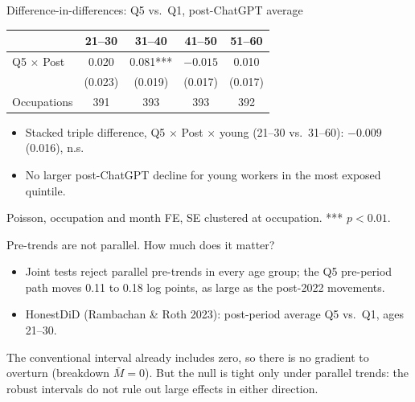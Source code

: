 \begin{frame}{Difference-in-differences: Q5 vs.\ Q1, post-ChatGPT average}
\centering
\setlength{\tabcolsep}{8pt}
\begin{tabular}{lcccc}
\toprule
 & 21--30 & 31--40 & 41--50 & 51--60 \\
\midrule
Q5 $\times$ Post & 0.020 & 0.081*** & $-0.015$ & 0.010 \\
                 & (0.023) & (0.019) & (0.017) & (0.017) \\
\midrule
Occupations & 391 & 393 & 393 & 392 \\
\bottomrule
\end{tabular}

\vspace{0.8em}
\begin{itemize}\setlength{\itemsep}{4pt}
  \item Stacked triple difference, Q5 $\times$ Post $\times$ young (21--30 vs.\ 31--60): $-0.009$ (0.016), n.s.
  \item No larger post-ChatGPT decline for young workers in the most exposed quintile.
\end{itemize}

\vspace{0.2em}
\footnotesize
Poisson, occupation and month FE, SE clustered at occupation. *** $p<0.01$.
\end{frame}

\begin{frame}{Pre-trends are not parallel. How much does it matter?}
\small
\begin{itemize}\setlength{\itemsep}{2pt}
  \item Joint tests reject parallel pre-trends in every age group; the Q5 pre-period path moves 0.11 to 0.18 log points, as large as the post-2022 movements.
  \item HonestDiD (Rambachan \& Roth 2023): post-period average Q5 vs.\ Q1, ages 21--30.
\end{itemize}

\vspace{0.2em}
\centering
\footnotesize
\renewcommand{\arraystretch}{0.95}


\vspace{0.3em}
The conventional interval already includes zero, so there is no gradient to overturn (breakdown $\bar M = 0$). But the null is tight only under parallel trends: the robust intervals do not rule out large effects in either direction.
\end{frame}

